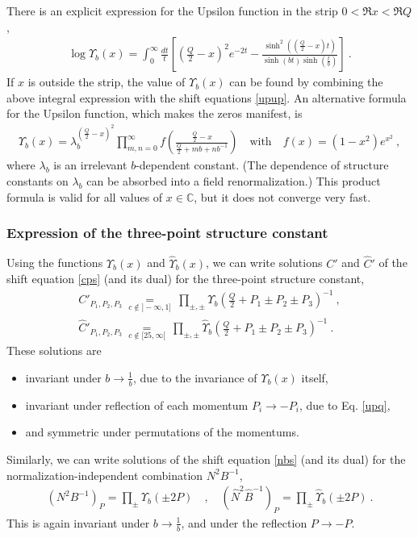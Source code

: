 \documentclass[12pt, a4paper, notitlepage, twoside]{report}
\numberwithin{equation}{section}
\theoremstyle{break}
\begin{document}
There is an explicit expression for the Upsilon function in the strip $0<\Re x<\Re Q$, 
\begin{align}
 \log\Upsilon_b(x) = \int_0^\infty \frac{dt}{t} \left[\left(\tfrac{Q}{2}-x\right)^2 e^{-2t} -\frac{\sinh^2\left(\left(\frac{Q}{2}-x\right)\!t\right)}{\sinh (bt)\sinh\left(\frac{t}{b}\right)}\right]\ .
\label{lup}
\end{align}
If $x$ is outside the strip, the value of $\Upsilon_b(x)$ can be found by combining the above integral expression with the shift equations \eqref{upup}.
An alternative formula for the Upsilon function, which makes the zeros manifest, is 
\begin{align}
 \Upsilon_b(x) = \lambda_b^{(\frac{Q}{2}-x)^2}\prod_{m,n=0}^\infty f\left(\frac{\frac{Q}{2}-x}{\frac{Q}{2}+mb+nb^{-1}}\right) \quad \text{with} \quad f(x)=(1-x^2)e^{x^2}\ ,
\end{align}
where $\lambda_b$ is an irrelevant $b$-dependent constant. (The dependence of structure constants on $\lambda_b$ can be absorbed into a field renormalization.)
This product formula is valid for all values of $x\in\mathbb{C}$, but it does not converge very fast.

\subsubsection{Expression of the three-point structure constant}

Using the functions $\Upsilon_b(x)$ and $\hat\Upsilon_b(x)$, we can write solutions $C'$ and $\hat C'$ of the shift equation \eqref{cps} (and its dual) for the three-point structure constant, 
\begin{align}
 \boxed{C'_{P_1,P_2,P_3} \ \underset{c\notin ]-\infty, 1]}{=}\ \prod_{\pm,\pm} \Upsilon_b\left(\tfrac{Q}{2}+P_1\pm P_2 \pm P_3\right)^{-1} }\ ,
 \label{cp}
 \\
 \boxed{\hat C'_{P_1,P_2,P_3} \ \underset{c\notin [25,\infty[}{=}\ \prod_{\pm,\pm} \hat\Upsilon_b\left(\tfrac{Q}{2}+P_1\pm P_2 \pm P_3\right)^{-1}}\ .
 \label{hcp}
\end{align}
These solutions are 
\begin{itemize}
 \item invariant under $b\to \frac{1}{b}$, due to the invariance of $\Upsilon_b(x)$ itself,
 \item invariant under reflection of each momentum $P_i\to -P_i$, due to Eq. \eqref{upq},
 \item and symmetric under permutations of the momentums.
\end{itemize}
Similarly, we can write solutions of the shift equation \eqref{nbs} (and its dual) for the normalization-independent combination $N^2B^{-1}$,
\begin{align}
 \boxed{\left(N^2B^{-1}\right)_P =\prod_\pm \Upsilon_b(\pm 2P)} \quad , \quad \boxed{\left(\hat N^2\hat B^{-1}\right)_P = \prod_\pm \hat\Upsilon_b(\pm 2P) } \ .
\end{align}
This is again invariant under $b\to \frac{1}{b}$, and under the reflection $P\to -P$.
\end{document}
